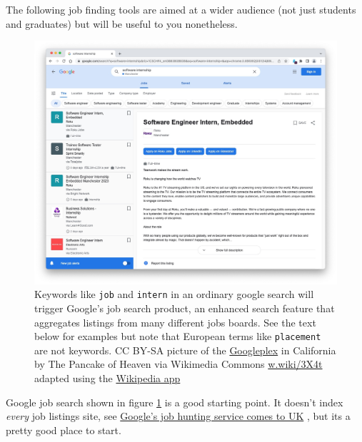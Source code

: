 \documentclass[
]{book}
\begin{document}
The following job finding tools are aimed at a wider audience (not just students and graduates) but will be useful to you nonetheless.

\begin{figure}

{\centering \includegraphics[width=0.9\linewidth]{images/google-job-search} 

}

\caption{Keywords like \texttt{job} and \texttt{intern} in an ordinary google search will trigger Google's job search product, an enhanced search feature that aggregates listings from many different jobs boards. See the text below for examples but note that European terms like \texttt{placement} are not keywords. CC BY-SA picture of the \href{https://en.wikipedia.org/wiki/Googleplex}{Googleplex} in California by The Pancake of Heaven via Wikimedia Commons \href{https://w.wiki/3X4t}{w.wiki/3X4t} adapted using the \href{https://apps.apple.com/us/app/wikipedia/id324715238}{Wikipedia app}}\label{fig:googlejobs-fig}
\end{figure}



Google job search shown in figure \ref{fig:googlejobs-fig} is a good starting point. It doesn't index \emph{every} job listings site, see \href{https://www.bbc.co.uk/news/technology-44853472}{Google's job hunting service comes to UK} \citep{noindeed}, but its a pretty good place to start.
\end{document}

